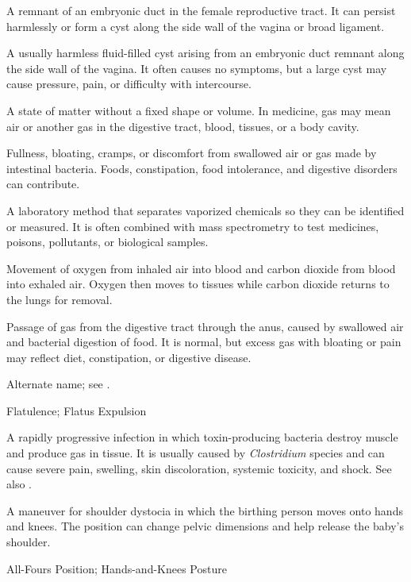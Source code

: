  A remnant of an embryonic duct in the female reproductive tract. It can persist harmlessly or form a cyst along the side wall of the vagina or broad ligament.

 A usually harmless fluid-filled cyst arising from an embryonic duct remnant along the side wall of the vagina. It often causes no symptoms, but a large cyst may cause pressure, pain, or difficulty with intercourse.

 A state of matter without a fixed shape or volume. In medicine, gas may mean air or another gas in the digestive tract, blood, tissues, or a body cavity.

 Fullness, bloating, cramps, or discomfort from swallowed air or gas made by intestinal bacteria. Foods, constipation, food intolerance, and digestive disorders can contribute.

 A laboratory method that separates vaporized chemicals so they can be identified or measured. It is often combined with mass spectrometry to test medicines, poisons, pollutants, or biological samples.

 Movement of oxygen from inhaled air into blood and carbon dioxide from blood into exhaled air. Oxygen then moves to tissues while carbon dioxide returns to the lungs for removal.

 Passage of gas from the digestive tract through the anus, caused by swallowed air and bacterial digestion of food. It is normal, but excess gas with bloating or pain may reflect diet, constipation, or digestive disease.

 Alternate name; see .

\synonyms
Flatulence; Flatus Expulsion

 A rapidly progressive infection in which toxin-producing bacteria destroy muscle and produce gas in tissue. It is usually caused by \textit{Clostridium} species and can cause severe pain, swelling, skin discoloration, systemic toxicity, and shock. See also .

 A maneuver for shoulder dystocia in which the birthing person moves onto hands and knees. The position can change pelvic dimensions and help release the baby’s shoulder.

\synonyms
All-Fours Position; Hands-and-Knees Posture

